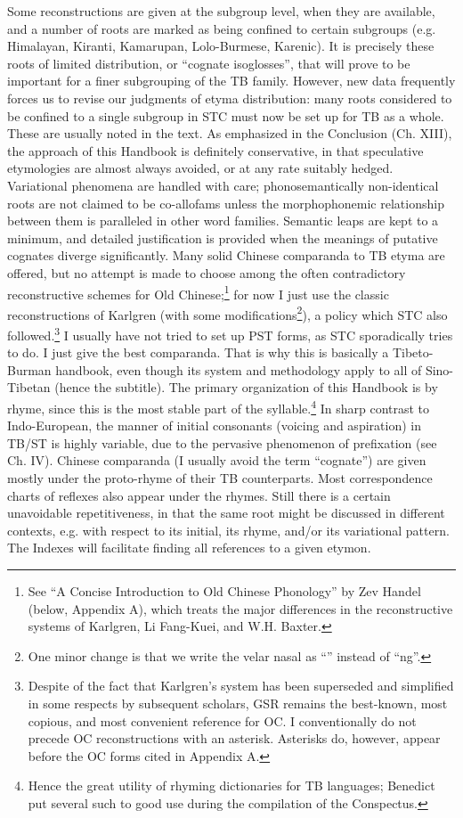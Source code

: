 Some reconstructions are given at the subgroup level, when they are available, and a number of roots are marked as being confined to certain subgroups (e.g. Himalayan, Kiranti, Kamarupan, Lolo-Burmese, Karenic). It is precisely these roots of limited distribution, or ``cognate isoglosses'', that will prove to be important for a finer subgrouping of the TB family. However, new data frequently forces us to revise our judgments of etyma distribution: many roots considered to be confined to a single subgroup in STC must now be set up for TB as a whole. These are usually noted in the text.
As emphasized in the Conclusion (Ch. XIII), the approach of this Handbook is definitely conservative, in that speculative etymologies are almost always avoided, or at any rate suitably hedged. Variational phenomena are handled with care; phonosemantically non-identical roots are not claimed to be co-allofams unless the morphophonemic relationship between them is paralleled in other word families. Semantic leaps are kept to a minimum, and detailed justification is provided when the meanings of putative cognates diverge significantly. Many solid Chinese comparanda to TB etyma are offered, but no attempt is made to choose among the often contradictory reconstructive schemes for Old Chinese;\footnote{See ``A Concise Introduction to Old Chinese Phonology'' by Zev Handel (below, Appendix A), which treats the major differences in the reconstructive systems of Karlgren, Li Fang-Kuei, and W.H. Baxter.} for now I just use the classic reconstructions of Karlgren (with some modifications\footnote{One minor change is that we write the velar nasal as ``{\ng}'' instead of ``ng''.}), a policy which STC also followed.\footnote{Despite of the fact that Karlgren's system has been superseded and simplified in some respects by subsequent scholars, GSR remains the best-known, most copious, and most convenient reference for OC. I conventionally do not precede OC reconstructions with an asterisk. Asterisks do, however, appear before the OC forms cited in Appendix A.} I usually have not tried to set up PST forms, as STC sporadically tries to do. I just give the best comparanda. That is why this is basically a Tibeto-Burman handbook, even though its system and methodology apply to all of Sino-Tibetan (hence the subtitle).
The primary organization of this Handbook is by rhyme, since this is the most stable part of the syllable.\footnote{Hence the great utility of rhyming dictionaries for TB languages; Benedict put several such to good use during the compilation of the Conspectus.} In sharp contrast to Indo-European, the manner of initial consonants (voicing and aspiration) in TB/ST is highly variable, due to the pervasive phenomenon of prefixation (see Ch. IV). Chinese comparanda (I usually avoid the term ``cognate'') are given mostly under the proto-rhyme of their TB counterparts. Most correspondence charts of reflexes also appear under the rhymes. Still there is a certain unavoidable repetitiveness, in that the same root might be discussed in different contexts, e.g. with respect to its initial, its rhyme, and/or its variational pattern. The Indexes will facilitate finding all references to a given etymon.
